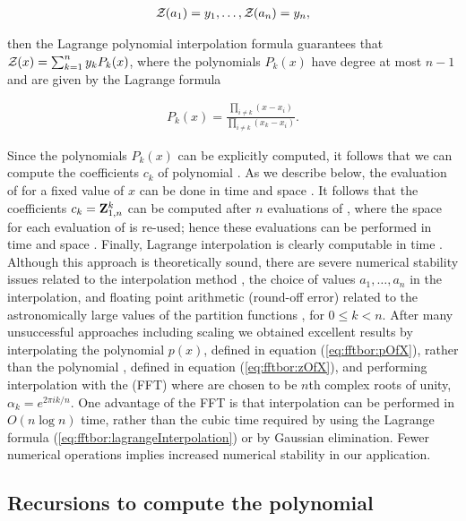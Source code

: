 \begin{align}
\label{eq:fftbor:solutionsForAlpha}
\emZof{}{a_1} = y_1,\dots, \emZof{}{a_n} = y_n,
\end{align}

then the Lagrange polynomial interpolation formula guarantees that
${\mathcal Z}_{}(x) = \sum_{k=1}^n y_k P_k(x)$, where the polynomials $P_k(x)$ have degree
at most $n-1$ and are given by the Lagrange formula

\begin{align}
\label{eq:fftbor:lagrangeInterpolation}
P_k(x) = \frac{\prod_{i\ne k} (x-x_i)}{\prod_{i \ne k} (x_k-x_i)}.
\end{align}

Since the polynomials $P_k(x)$ can be explicitly computed, it follows that
we can compute the coefficients $c_k$ of polynomial \emZ{}. As we describe
below, the evaluation of \emZ{} for a fixed value of $x$ can be done in
time  and space .  It follows that the coefficients
$c_k={\bf Z}^{k}_{1,n}$ can be computed after
$n$ evaluations of \emZ{}, where the space for each evaluation of \emZ{}
is re-used; hence these evaluations can be performed in time  and space
. Finally,
Lagrange interpolation is clearly computable in time .
Although this approach is theoretically sound, there are severe
numerical stability issues related to the interpolation method
\cite{HighamBarycentricInterpolation},
the choice of values $a_1,\dots,a_{n}$ in the interpolation,
and floating point arithmetic (round-off error) related to the
astronomically large values of the partition functions
, for $0 \leq k < n$. After many unsuccessful
approaches including scaling we obtained excellent results by
interpolating the polynomial $p(x)$, defined in equation (\ref{eq:fftbor:pOfX}),
rather than the polynomial \emZ{}, defined in equation (\ref{eq:fftbor:zOfX}),
and performing interpolation with the \fft (FFT) \cite{cormen}
where \alphaN are
chosen to be $n$th complex roots of unity,
$\alpha_k = e^{2 \pi i k/n}$.
One
advantage of the FFT is that interpolation can be performed in $O(n \log n)$
time, rather than the cubic time required by using the Lagrange formula
(\ref{eq:fftbor:lagrangeInterpolation}) or by Gaussian elimination. Fewer
numerical operations implies increased numerical stability in our application.

\subsection{Recursions to compute the polynomial
\texorpdfstring{}{}}
\label{subsec:fftbor:polynomial}

